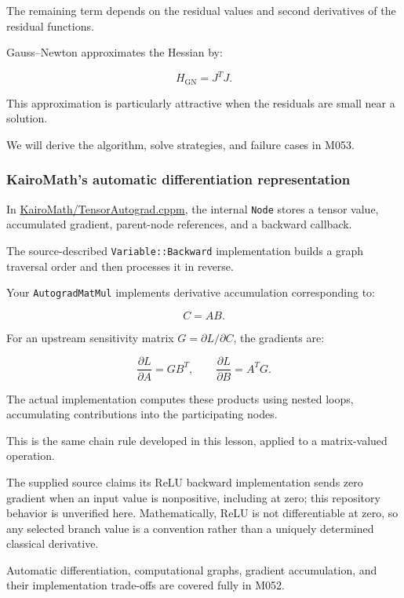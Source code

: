 The remaining term depends on the residual values and second derivatives of the residual functions.

Gauss--Newton approximates the Hessian by:

\[
H_{\mathrm{GN}}=J^TJ.
\]

This approximation is particularly attractive when the residuals are small near a solution.

We will derive the algorithm, solve strategies, and failure cases in M053.

\subsubsection{KairoMath's automatic differentiation representation}\label{02-foundations-ii-ch021-kairomaths-automatic-differentiation-representation}

In \href{https://github.com/swayam8624/KairoMath/blob/master/TensorAutograd.cppm?utm_source=chatgpt.com}{KairoMath/TensorAutograd.cppm}, the internal \texttt{Node} stores a tensor value, accumulated gradient, parent-node references, and a backward callback.

The source-described \texttt{Variable::Backward} implementation builds a graph traversal order and then processes it in reverse.

Your \texttt{AutogradMatMul} implements derivative accumulation corresponding to:

\[
C=AB.
\]

For an upstream sensitivity matrix \(G=\partial L/\partial C\), the gradients are:

\[
\boxed{ \frac{\partial L}{\partial A}=GB^T, \qquad \frac{\partial L}{\partial B}=A^TG }.
\]

The actual implementation computes these products using nested loops, accumulating contributions into the participating nodes.

This is the same chain rule developed in this lesson, applied to a matrix-valued operation.

The supplied source claims its ReLU backward implementation sends zero gradient when an input value is nonpositive, including at zero; this repository behavior is unverified here. Mathematically, ReLU is not differentiable at zero, so any selected branch value is a convention rather than a uniquely determined classical derivative.

Automatic differentiation, computational graphs, gradient accumulation, and their implementation trade-offs are covered fully in M052.

